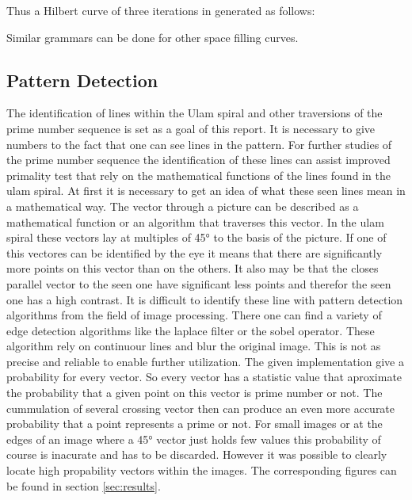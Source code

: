 Thus a Hilbert curve of three iterations in generated as follows:

Similar grammars can be done for other space filling curves.

\subsection{Pattern Detection}
\label{sec:pattern}
The identification of lines within the Ulam spiral and other traversions of the prime number sequence is set as a goal of this report. It is necessary to give numbers to the fact that one can see lines in the pattern. For further studies of the prime number sequence the identification of these lines can assist improved primality test that rely on the mathematical functions of the lines found in the ulam spiral.
At first it is necessary to get an idea of what these seen lines mean in a mathematical way. The vector through a picture can be described as a mathematical function or an algorithm that traverses this vector. In the ulam spiral these vectors lay at multiples of 45° to the basis of the picture.
If one of this vectores can be identified by the eye it means that there are significantly more points on this vector than on the others. It also may be that the closes parallel vector to the seen one have significant less points and therefor the seen one has a high contrast.
It is difficult to identify these line with pattern detection algorithms from the field of image processing. There one can find a variety of edge detection algorithms like the laplace filter or the sobel operator. These algorithm rely on continuour lines and blur the original image. This is not as precise and reliable to enable further utilization.
The given implementation give a probability for every vector. So every vector has a statistic value that aproximate the probability that a given point on this vector is prime number or not. The cummulation of several crossing vector then can produce an even more accurate probability that a point represents a prime or not.
For small images or at the edges of an image where a 45° vector just holds few values this probability of course is inacurate and has to be discarded. However it was possible to clearly locate high propability vectors within the images. The corresponding figures can be found in section \ref{sec:results}.

